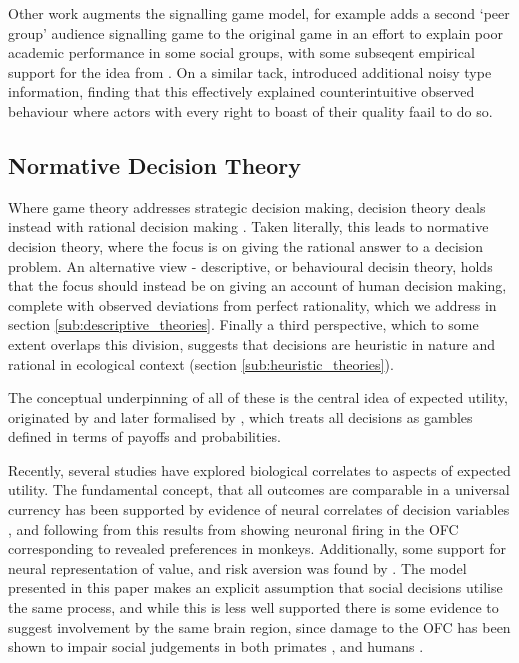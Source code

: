 Other work augments the signalling game model, for example \citet{Austen-Smith2005} adds a second `peer group' audience signalling game to the original \citeauthor{Spence1973} game in an effort to explain poor academic performance in some social groups, with some subseqent empirical support for the idea from \citet{Jr2010}. On a similar tack, \citet{Feltovich2002} introduced additional noisy type information, finding that this effectively explained counterintuitive observed behaviour where actors with every right to boast of their quality faail to do so.

\subsection{Normative Decision Theory}

Where game theory addresses strategic decision making, decision theory deals instead with rational decision making \citep{Peterson2009}.  Taken literally, this leads to normative decision theory, where the focus is on giving the rational answer to a decision problem. An alternative view - descriptive, or behavioural decisin theory, holds that the focus should instead be on giving an account of human decision making, complete with observed deviations from perfect rationality, which we address in section \ref{sub:descriptive_theories}. Finally a third perspective, which to some extent overlaps this division, suggests that decisions are heuristic in nature and rational in ecological context (section \ref{sub:heuristic_theories}).

The conceptual underpinning of all of these is the central idea of expected utility, originated by \citet{Bernoulli1954} and later formalised by \citet{Neumann1953}, which treats all decisions as gambles defined in terms of payoffs and probabilities.

Recently, several studies have explored biological correlates to aspects of expected utility. The fundamental concept, that all outcomes are comparable in a universal currency has been supported by evidence of neural correlates of decision variables \citep{Platt1999}, and following from this results from \citet{Padoa-Schioppa2006,Padoa-Schioppa2008} showing neuronal firing in the \ac{OFC} corresponding to revealed preferences in monkeys. Additionally, some support for neural representation of value, and risk aversion was found by \citet{Christopoulos2009}. The model presented in this paper makes an explicit assumption that social decisions utilise the same process, and while this is less well supported there is some evidence to suggest involvement by the same brain region, since damage to the \ac{OFC} has been shown to impair social judgements in both primates \citep{Watson2012}, and humans \citep{Willis2010}.


